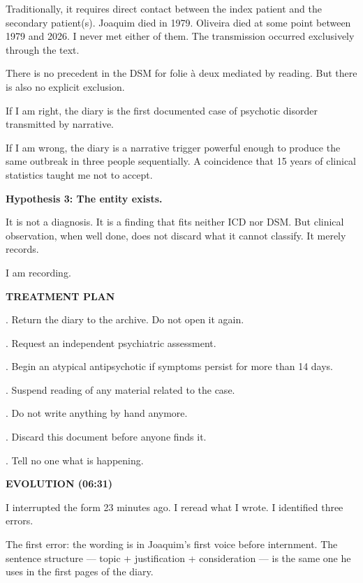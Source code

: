 \noindent Traditionally, it requires direct contact between the
\noindent index patient and the secondary patient(s). Joaquim died in 1979.
\noindent Oliveira died at some point between 1979 and 2026. I never
\noindent met either of them. The transmission occurred exclusively
\noindent through the text.

\noindent There is no precedent in the DSM for folie à deux mediated
\noindent by reading. But there is also no explicit exclusion.

\noindent If I am right, the diary is the first documented
\noindent case of psychotic disorder transmitted by narrative.

\noindent If I am wrong, the diary is a narrative trigger
\noindent powerful enough to produce the same outbreak in three people
\noindent sequentially. A coincidence that 15 years of clinical statistics
\noindent taught me not to accept.

\noindent \textbf{Hypothesis 3: The entity exists.}

\noindent It is not a diagnosis. It is a finding that
\noindent fits neither ICD nor DSM. But clinical observation, when well
\noindent done, does not discard what it cannot classify. It merely records.

\noindent I am recording.

\noindent \textbf{TREATMENT PLAN}

. Return the diary to the archive. Do not open it again.

. Request an independent psychiatric assessment.

. Begin an atypical antipsychotic if symptoms
\noindent persist for more than 14 days.

. Suspend reading of any material related
\noindent to the case.

. Do not write anything by hand anymore.

. Discard this document before anyone finds it.

. Tell no one what is happening.

\noindent \textbf{EVOLUTION (06:31)}

\noindent I interrupted the form 23 minutes ago. I reread what I wrote.
\noindent I identified three errors.

\noindent The first error: the wording is in Joaquim's first voice before
\noindent internment. The sentence structure --- topic + justification + consideration ---
\noindent is the same one he uses in the first pages of the diary.


